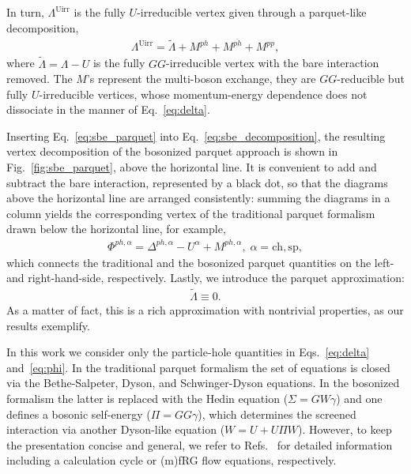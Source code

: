 \documentclass[epj]{svjour}
\newcommand{\ch}{\ensuremath{\text{ch}}}
\newcommand{\sz}{\ensuremath{\text{sp}}}
\newcommand{\pp}{\ensuremath{{pp}}}
\newcommand{\ph}{\ensuremath{{ph}}}
\newcommand{\phv}{\ensuremath{\overline{ph}}}
\begin{document}
In turn, $\Lambda^\text{Uirr}$ is the fully $U$-irreducible vertex given through a parquet-like decomposition,
\begin{align}
\Lambda^\text{Uirr}=\tilde{\Lambda}+M^{\ph}+M^{\phv}+M^{\pp},\label{eq:sbe_parquet}
\end{align}
where $\tilde\Lambda=\Lambda-U$ is the fully $GG$-irreducible vertex with the bare interaction removed.
The $M$'s represent the multi-boson exchange, they are $GG$-reducible but fully $U$-irreducible vertices,
whose momentum-energy dependence does not dissociate in the manner of Eq.~\eqref{eq:delta}.

Inserting Eq.~\eqref{eq:sbe_parquet} into Eq.~\eqref{eq:sbe_decomposition},
the resulting vertex decomposition of the bosonized parquet approach
is shown in Fig.~\ref{fig:sbe_parquet}, above the horizontal line.
It is convenient to add and subtract the bare interaction, represented by a black dot,
so that the diagrams above the horizontal line are arranged consistently:
summing the diagrams in a column yields the corresponding vertex
of the traditional parquet formalism drawn below the horizontal line, for example,
\begin{align}
\Phi^{\ph,\alpha}=\Delta^{\ph,\alpha}-U^\alpha+M^{\ph,\alpha},\;\alpha=\ch,\sz,\label{eq:phi}
\end{align}
which connects the traditional and the bosonized parquet quantities on the left- and right-hand-side, respectively.
Lastly, we introduce the parquet approximation:
\begin{align}
\tilde{\Lambda}\equiv0.\label{eq:parquet_approximation}
\end{align}
As a matter of fact, this is a rich approximation with nontrivial properties, as our results exemplify.

In this work we consider only the particle-hole quantities in Eqs.~\eqref{eq:delta} and~\eqref{eq:phi}.
In the traditional parquet formalism the set of equations is closed via the Bethe-Salpeter,
Dyson, and Schwinger-Dyson equations.
In the bosonized formalism the latter is replaced with the Hedin equation ($\Sigma=GW\gamma$) 
and one defines a bosonic self-energy ($\Pi=GG\gamma$),
which determines the screened interaction via another Dyson-like equation ($W=U+U\Pi W$).
However, to keep the presentation concise and general, we refer to Refs.~\cite{Krien21-2,Bonetti22,Walter22}
for detailed information including a calculation cycle or (m)fRG flow equations, respectively.
\end{document}
